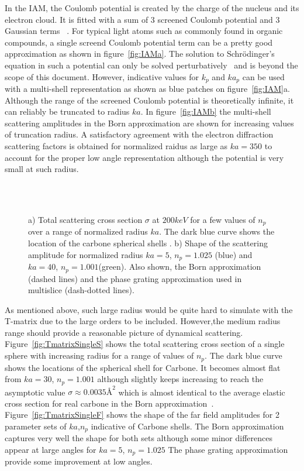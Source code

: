 In the IAM, the Coulomb potential is created by the charge of the nucleus and its
electron cloud. It is fitted with a sum of 3 screened Coulomb potential and
3 Gaussian terms ~\cite{Kirkland2019}.
For typical light atoms such as commonly found in organic compounds, a single
screend Coulomb potential term can be a pretty good approximation as shown in
figure~\ref{fig:IAMa}. The solution to Schr{\"o}dinger's equation in such a
potential can only be solved perturbatively~\cite{Muller1965} and is beyond the
scope of this document. However, indicative values for $k_p$ and $ka_p$
can be used with a multi-shell representation as shown as blue patches on
figure~\ref{fig:IAM}a. Although the range of the screened Coulomb potential
is theoretically infinite, it can reliably be truncated to radius $ka$.
In figure~\ref{fig:IAMb} the multi-shell scattering amplitudes in the Born
approximation are shown for increasing values of truncation radius.
A satisfactory agreement with the electron diffraction scattering factors is obtained for normalized raidus
as large as $ka=350$ to account for the proper low angle representation
although the potential is very small at such radius.


\begin{figure}[h!]
  \centering
  \\
  \vspace{-2em}
  \\
\caption{
a) Total scattering cross section $\sigma$ at $200keV$ for a few
values of $n_p$ over a range of normalized radius $ka$. The dark blue
curve shows the location of the carbone spherical shells .
b) Shape of the scattering amplitude for normalized radius
$ka=5$, $n_p=1.025$ (blue)
and $ka=40$, $n_p=1.001$(green).
Also shown, the Born approximation (dashed lines) and
the phase grating approximation used in multislice (dash-dotted lines).
}%
\end{figure}

As mentioned above, such large radius would be quite hard to simulate with
the T-matrix due to the large orders to be included. However,the medium radius
range should provide a reasonable picture of dynamical scattering.
Figure~\ref{fig:TmatrixSingleS} shows the total scattering cross section of
a single sphere with increasing radius for a range of values of $n_p$. The dark
blue curve shows the locations of the spherical shell for Carbone. It becomes almost
flat from $ka=30$, $n_p=1.001$ although slightly keeps increasing to reach the
asymptotic value $\sigma\approx 0.0035\text{\AA}^2$ which is almost identical to the
average elastic cross section for real carbone in the Born approximation~\cite{Latychevskaia2019}.
Figure~\ref{fig:TmatrixSingleF} shows the shape of the far field
amplitudes for 2 parameter sets of $ka$,$n_p$ indicative of Carbone shells.
The Born approximation captures very well the shape for both sets
although some minor differences appear at large angles for $ka=5$, $n_p=1.025$
The phase grating approximation provide some improvement at low angles.

